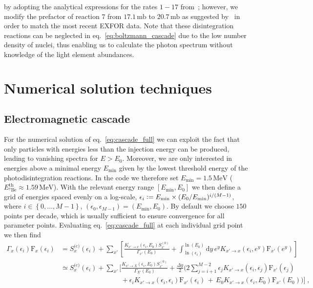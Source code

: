 \documentclass[11pt,a4paper]{article}
\newcommand{\Fpdi}{\mathrm{F}}
\newcommand{\eqsp}{\;}
\newcommand{\e}{\,}
\newcommand{\X}{x}
\newcommand{\ldefine}{\vcentcolon=}
\begin{document}
by adopting the analytical expressions for the rates $1-17$ from~\cite{Cyburt:2002uv}; however, we modify the prefactor of reaction $7$ from $17.1\e\mathrm{mb}$ to $20.7\e\mathrm{mb}$ as suggested by~\cite{Jedamzik:2006xz} in order to match the most recent EXFOR data. Note that these disintegration reactions can be neglected in eq.~\eqref{eq:boltzmann_cascade} due to the low number density of nuclei, thus enabling us to calculate the photon spectrum without knowledge of the light element abundances.

\section{Numerical solution techniques}

\subsection{Electromagnetic cascade}
For the numerical solution of eq.~\eqref{eq:cascade_full} we can exploit the fact that only particles with energies less than the injection energy can be produced, leading to vanishing spectra for $E > E_0$. Moreover, we are only interested in energies above a minimal energy $E_\text{min}$ given by the lowest threshold energy of the photodisintegration reactions. In the code we therefore set $E_\text{min} = 1.5\e\mathrm{MeV}$ ($E_{{}^7\mathrm{Be}}^\mathrm{th} \approx 1.59 \, \mathrm{MeV}$). With the relevant energy range $[E_\text{min}, E_0]$ we then define a grid of energies spaced evenly on a log-scale, $\epsilon_i \ldefine E_\text{min} \times (E_0 / E_\text{min})^{i/(M-1)}$, where $i \in \left\{ 0, \dots, M-1 \right\}$, $(\epsilon_0, \epsilon_{M-1}) = (E_\text{min}, E_0)$. By default we choose $150$ points per decade, which is usually sufficient to ensure convergence for all parameter points. Evaluating eq.~\eqref{eq:cascade_full} at each individual grid point we then find~\cite{Hufnagel:2020nxa}
\begin{align}
\Gamma_\X(\epsilon_i) \Fpdi_\X(\epsilon_i)  &= S_\X^{\text{(c)}}(\epsilon_i) + \sum_{\X'} \left[ \frac{K_{\X' \to \X} (\epsilon_i, E_0) S_{\X'}^{(0)}}{\Gamma_{\X'} (E_0)} + \int_{\ln(\epsilon_i)}^{\ln(E_0)} \text{d} y \, e^y K_{\X' \to \X} (\epsilon_i, e^y) \Fpdi_{\X'}(e^y)\right] \nonumber \\[4mm]
&\simeq S_\X^{\text{(c)}}(\epsilon_i) +  \sum_{\X'} \bigg[ \frac{K_{\X' \to X} (\epsilon_i, E_0) S_{\X'}^{(0)}}{\Gamma_{X'} (E_0)} + \frac{\Delta y}{2} \bigg( 2 \sum_{j=i+1}^{M-2} \epsilon_j K_{\X' \to \X} (\epsilon_i, \epsilon_j) \Fpdi_{\X'}(\epsilon_j)\nonumber\\
&\qquad\quad\qquad\qquad\quad\;\;\; +\epsilon_i K_{\X' \to \X} (\epsilon_i, \epsilon_i) \Fpdi_{\X'}(\epsilon_i)\,  +\,  E_0 K_{\X' \to \X} (\epsilon_i, E_0) \Fpdi_{\X'}(E_0) \bigg) \bigg]\eqsp,
\label{eq:FXi}
\end{align}
\end{document}
